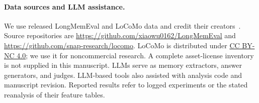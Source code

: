 \documentclass{article}
\begin{document}
\paragraph{Data sources and LLM assistance.}
We use released LongMemEval and LoCoMo data and credit their
creators~\citep{wu2025longmemeval,maharana2024locomo}.
Source repositories are
\url{https://github.com/xiaowu0162/LongMemEval} and
\url{https://github.com/snap-research/locomo}.
LoCoMo is distributed under
\href{https://creativecommons.org/licenses/by-nc/4.0/}{CC BY-NC 4.0};
we use it for noncommercial research.
A complete asset-license inventory is not supplied in this manuscript.
LLMs serve as memory extractors, answer generators, and judges.
LLM-based tools also assisted with analysis code and manuscript revision.
Reported results refer to logged experiments or the stated reanalysis
of their feature tables.
\end{document}
